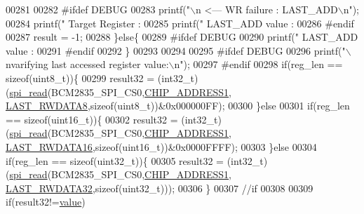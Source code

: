 \begin{DoxyCode}
{{{{{00281              
00282 \textcolor{preprocessor}{     #ifdef DEBUG}
00283 \textcolor{preprocessor}{}       printf(\textcolor{stringliteral}{"\(\backslash\)n                                               <---  WR failure : LAST\_ADD\(\backslash\)n"});
00284        printf(\textcolor{stringliteral}{"        Target Register :%
00285        printf(\textcolor{stringliteral}{"        LAST\_ADD value  :%
00286 \textcolor{preprocessor}{     #endif}
00287 \textcolor{preprocessor}{}     result = -1;
00288      \}\textcolor{keywordflow}{else}\{
00289 \textcolor{preprocessor}{      #ifdef DEBUG}
00290 \textcolor{preprocessor}{}        printf(\textcolor{stringliteral}{"       LAST\_ADD value  :%
00291 \textcolor{preprocessor}{      #endif}
00292 \textcolor{preprocessor}{}     \}
00293      
00294     
00295 \textcolor{preprocessor}{     #ifdef DEBUG}
00296 \textcolor{preprocessor}{}       printf(\textcolor{stringliteral}{"\(\backslash\)nvarifying last accessed register  value:\(\backslash\)n"});
00297 \textcolor{preprocessor}{     #endif}
00298 \textcolor{preprocessor}{}    \textcolor{keywordflow}{if}(reg\_len == \textcolor{keyword}{sizeof}(uint8\_t))\{
00299         result32 = (int32\_t)(\hyperlink{a00006_ga7ad9f65ee46aca507374096506a0b1c4}{spi\_read}(BCM2835\_SPI\_CS0,\hyperlink{a00036_a94de2b046db6e10257ef4481c0a15eaa}{CHIP\_ADDRESS1},
      \hyperlink{a00035_ac23cb2354e07d7403fca849805a8e278}{LAST\_RWDATA8},\textcolor{keyword}{sizeof}(uint8\_t))&0x000000FF);
00300     \}\textcolor{keywordflow}{else}   
00301     \textcolor{keywordflow}{if}(reg\_len == \textcolor{keyword}{sizeof}(uint16\_t))\{
00302         result32 = (int32\_t)(\hyperlink{a00006_ga7ad9f65ee46aca507374096506a0b1c4}{spi\_read}(BCM2835\_SPI\_CS0,\hyperlink{a00036_a94de2b046db6e10257ef4481c0a15eaa}{CHIP\_ADDRESS1},
      \hyperlink{a00035_afcefca411effe86930341732382fb5e5}{LAST\_RWDATA16},\textcolor{keyword}{sizeof}(uint16\_t))&0x0000FFFF);
00303     \}\textcolor{keywordflow}{else}
00304     \textcolor{keywordflow}{if}(reg\_len == \textcolor{keyword}{sizeof}(uint32\_t))\{
00305         result32 = (int32\_t)(\hyperlink{a00006_ga7ad9f65ee46aca507374096506a0b1c4}{spi\_read}(BCM2835\_SPI\_CS0,\hyperlink{a00036_a94de2b046db6e10257ef4481c0a15eaa}{CHIP\_ADDRESS1},
      \hyperlink{a00035_a0d09934e23666ce21357121f281f2f2a}{LAST\_RWDATA32},\textcolor{keyword}{sizeof}(uint32\_t)));      
00306     \}   
00307     \textcolor{comment}{//if }
00308 
00309      \textcolor{keywordflow}{if}(result32!=\hyperlink{a00040_a638e4503e0ae6ce655b7ad2e17e8f0ad}{value})
}}}}}}}}
\end{DoxyCode}
